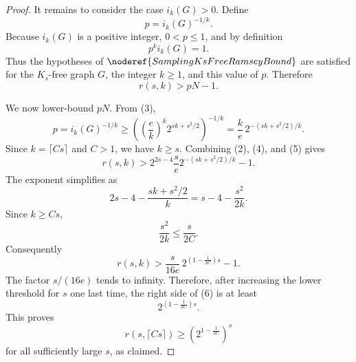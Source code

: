 \begin{proof}
It remains to consider the case \(i_k(G)>0\). Define
\[
  p=i_k(G)^{-1/k}.
\]
Because \(i_k(G)\) is a positive integer, \(0<p\le1\), and by definition
\[
  p^k i_k(G)=1.
\]
Thus the hypotheses of \(\noderef{SamplingKsFreeRamseyBound}\) are satisfied for the \(K_s\)-free graph \(G\), the integer \(k\ge1\), and this value of \(p\). Therefore
\[
  r(s,k)>pN-1. \tag{4}
\]

We now lower-bound \(pN\). From (3),
\[
  p=i_k(G)^{-1/k}
  \ge
  \left(\left(\frac e k\right)^k2^{sk+s^2/2}\right)^{-1/k}
  =
  \frac{k}{e}\,2^{-(sk+s^2/2)/k}. \tag{5}
\]
Since \(k=\lceil Cs\rceil\) and \(C>1\), we have \(k\ge s\). Combining (2), (4), and (5) gives
\[
  r(s,k)>
  2^{2s-4}\frac{s}{e}
  2^{-(sk+s^2/2)/k}-1.
\]
The exponent simplifies as
\[
  2s-4-\frac{sk+s^2/2}{k}
  =
  s-4-\frac{s^2}{2k}.
\]
Since \(k\ge Cs\),
\[
  \frac{s^2}{2k}\le \frac{s}{2C}.
\]
Consequently
\[
  r(s,k)>
  \frac{s}{16e}\,
  2^{(1-\frac1{2C})s}-1. \tag{6}
\]
The factor \(s/(16e)\) tends to infinity. Therefore, after increasing the lower threshold for \(s\) one last time, the right side of (6) is at least
\[
  2^{(1-\frac1{2C})s}.
\]
This proves
\[
  r(s,\lceil Cs\rceil)\ge
  \left(2^{1-\frac1{2C}}\right)^s
\]
for all sufficiently large \(s\), as claimed.
\end{proof}

